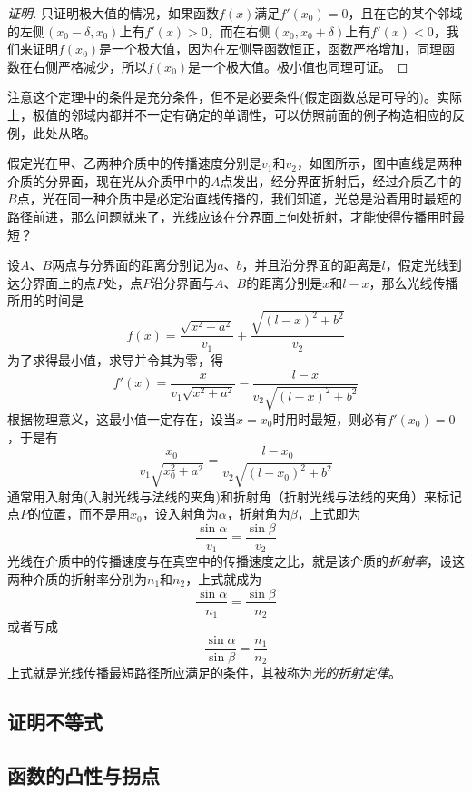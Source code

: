 \begin{proof}[证明]
 只证明极大值的情况，如果函数$f(x)$满足$f'(x_0)=0$，且在它的某个邻域的左侧$(x_0-\delta,x_0)$上有$f'(x)>0$，而在右侧$(x_0,x_0+\delta)$上有$f'(x)<0$，我们来证明$f(x_0)$是一个极大值，因为在左侧导函数恒正，函数严格增加，同理函数在右侧严格减少，所以$f(x_0)$是一个极大值。极小值也同理可证。
\end{proof}

\begin{example}
  注意这个定理中的条件是充分条件，但不是必要条件(假定函数总是可导的)。实际上，极值的邻域内都并不一定有确定的单调性，可以仿照前面的例子构造相应的反例，此处从略。
\end{example}

\begin{example}[光的折射定律]
  假定光在甲、乙两种介质中的传播速度分别是$v_1$和$v_2$，如图所示，图中直线是两种介质的分界面，现在光从介质甲中的$A$点发出，经分界面折射后，经过介质乙中的$B$点，光在同一种介质中是必定沿直线传播的，我们知道，光总是沿着用时最短的路径前进，那么问题就来了，光线应该在分界面上何处折射，才能使得传播用时最短？

  设$A$、$B$两点与分界面的距离分别记为$a$、$b$，并且沿分界面的距离是$l$，假定光线到达分界面上的点$P$处，点$P$沿分界面与$A$、$B$的距离分别是$x$和$l-x$，那么光线传播所用的时间是
  \[ f(x) = \frac{\sqrt{x^2+a^2}}{v_1}+\frac{\sqrt{(l-x)^2+b^2}}{v_2} \]
  为了求得最小值，求导并令其为零，得
  \[ f'(x) = \frac{x}{v_1\sqrt{x^2+a^2}} - \frac{l-x}{v_2 \sqrt{(l-x)^2+b^2}} \]
  根据物理意义，这最小值一定存在，设当$x=x_0$时用时最短，则必有$f'(x_0)=0$，于是有
  \[ \frac{x_0}{v_1\sqrt{x_0^2+a^2}} = \frac{l-x_0}{v_2 \sqrt{(l-x_0)^2+b^2}}\]
  通常用入射角(入射光线与法线的夹角)和折射角（折射光线与法线的夹角）来标记点$P$的位置，而不是用$x_0$，设入射角为$\alpha$，折射角为$\beta$，上式即为
  \[ \frac{\sin{\alpha}}{v_1} = \frac{\sin{\beta}}{v_2} \]
  光线在介质中的传播速度与在真空中的传播速度之比，就是该介质的\emph{折射率}，设这两种介质的折射率分别为$n_1$和$n_2$，上式就成为
  \[ \frac{\sin{\alpha}}{n_1} = \frac{\sin{\beta}}{n_2} \]
  或者写成
  \[ \frac{\sin{\alpha}}{\sin{\beta}} = \frac{n_1}{n_2} \]
  上式就是光线传播最短路径所应满足的条件，其被称为\emph{光的折射定律}。
\end{example}

\subsection{证明不等式}
\label{sec:proof-inequality-use-derivative}

\subsection{函数的凸性与拐点}
\label{sec:convert-of-function}

